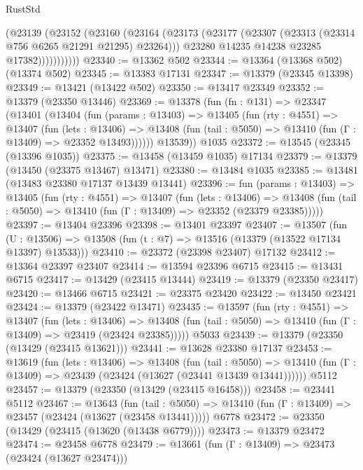 \begin{lexlean}{RustStd}
\begin{coremodule}
                (@23139
                  (@23152
                    (@23160
                      (@23164
                        (@23173
                          (@23177 (@23307 (@23313 (@23314 @756 @6265 @21291 @21295) @23264)))
                          @23280
                          @14235
                          @14238
                          @23285
                          @17382)))))))))))
@23340 := @13362 @502
@23344 := @13364 (@13368 @502) (@13374 @502)
@23345 := @13383 @17131
@23347 := @13379 (@23345 @13398)
@23349 := @13421 (@13422 @502)
@23350 := @13417 @23349
@23352 := @13379 (@23350 @13446)
@23369 := @13378
    (fun (fn : @131) =>
    @23347
      (@13401
        (@13404
          (fun (params : @13403) =>
          @13405
            (fun (rty : @4551) =>
            @13407
              (fun (lets : @13406) =>
              @13408 (fun (tail : @5050) => @13410 (fun (Γ : @13409) => @23352 @13493))))))
        @13539))
    @1035
@23372 := @13545 (@23345 (@13396 @1035))
@23375 := @13458 (@13459 @1035) @17134
@23379 := @13379 (@13450 (@23375 @13467) @13471)
@23380 := @13484 @1035
@23385 := @13481 (@13483 @23380 @17137 @13439 @13441)
@23396 := fun (params : @13403) =>
  @13405
    (fun (rty : @4551) =>
    @13407
      (fun (lets : @13406) =>
      @13408 (fun (tail : @5050) => @13410 (fun (Γ : @13409) => @23352 (@23379 @23385)))))
@23397 := @13404 @23396
@23398 := @13401 @23397
@23407 := @13507
    (fun (U : @13506) => @13508 (fun (t : @7) => @13516 (@13379 (@13522 @17134 @13397) @13533)))
@23410 := @23372 (@23398 @23407) @17132
@23412 := @13364 @23397 @23407
@23414 := @13594 @23396 @6715
@23415 := @13431 @6715
@23417 := @13429 (@23415 @13444)
@23419 := @13379 (@23350 @23417)
@23420 := @13466 @6715
@23421 := @23375 @23420
@23422 := @13450 @23421
@23424 := @13379 (@23422 @13471)
@23435 := @13597
    (fun (rty : @4551) =>
    @13407
      (fun (lets : @13406) =>
      @13408 (fun (tail : @5050) => @13410 (fun (Γ : @13409) => @23419 (@23424 @23385)))))
    @5033
@23439 := @13379 (@23350 (@13429 (@23415 @13621)))
@23441 := @13628 @23380 @17137
@23453 := @13619
    (fun (lets : @13406) =>
    @13408
      (fun (tail : @5050) =>
      @13410 (fun (Γ : @13409) => @23439 (@23424 (@13627 (@23441 @13439 @13441))))))
    @5112
@23457 := @13379 (@23350 (@13429 (@23415 @16458)))
@23458 := @23441 @5112
@23467 := @13643
    (fun (tail : @5050) => @13410 (fun (Γ : @13409) => @23457 (@23424 (@13627 (@23458 @13441)))))
    @6778
@23472 := @23350 (@13429 (@23415 (@13620 (@13438 @6779))))
@23473 := @13379 @23472
@23474 := @23458 @6778
@23479 := @13661 (fun (Γ : @13409) => @23473 (@23424 (@13627 @23474)))

\end{coremodule}
\end{lexlean}
